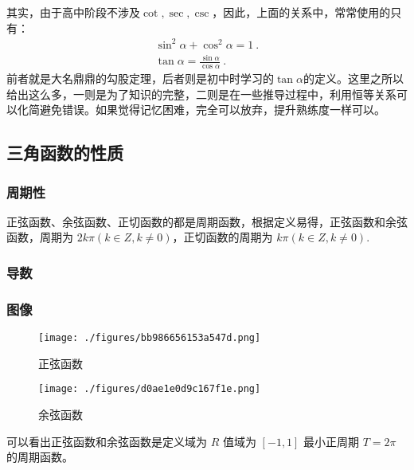 其实，由于高中阶段不涉及$\cot,\sec,\csc$，因此，上面的关系中，常常使用的只有：
\begin{gather}
\sin ^{2} \alpha + \cos ^{2}\alpha =1~.\\
\tan \alpha= \frac{\sin \alpha}{\cos \alpha}~.
\end{gather}
前者就是大名鼎鼎的勾股定理，后者则是初中时学习的$\tan\alpha$的定义。这里之所以给出这么多，一则是为了知识的完整，二则是在一些推导过程中，利用恒等关系可以化简避免错误。如果觉得记忆困难，完全可以放弃，提升熟练度一样可以。

\subsection{三角函数的性质}

\subsubsection{周期性}
正弦函数、余弦函数、正切函数的都是周期函数，根据定义易得，正弦函数和余弦函数，周期为 $2k\pi(k\in Z,k\neq0)$，正切函数的周期为 $k\pi(k\in Z,k\neq0)$.
\subsubsection{导数}

\subsubsection{图像}

\begin{figure}[ht]
\centering
\texttt{[image: ./figures/bb986656153a547d.png]}
\caption{正弦函数} \label{fig_HsTrFu_1}
\end{figure}
\begin{figure}[ht]
\centering
\texttt{[image: ./figures/d0ae1e0d9c167f1e.png]}
\caption{余弦函数} \label{fig_HsTrFu_2}
\end{figure}
可以看出正弦函数和余弦函数是定义域为 $R$ 值域为 $[-1,1]$ 最小正周期 $T = 2\pi$ 的周期函数。
